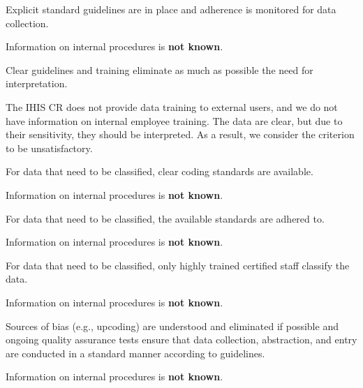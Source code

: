 \begin{QandA}
    \item Explicit standard guidelines are in place and adherence is monitored for data collection.
    \begin{answered}
        Information on internal procedures is \textbf{not known}.
    \end{answered}

    \item Clear guidelines and training eliminate as much as possible the need for interpretation.
    \begin{answered}
        The IHIS CR does not provide data training to external users, and we do not have information on internal employee training.
        The data are clear, but due to their sensitivity, they should be interpreted.
        As a result, we consider the criterion to be unsatisfactory.
    \end{answered}

    \item For data that need to be classified, clear coding standards are available.
    \begin{answered}
        Information on internal procedures is \textbf{not known}.
    \end{answered}

    \item For data that need to be classified, the available standards are adhered to.
    \begin{answered}
        Information on internal procedures is \textbf{not known}.
    \end{answered}

    \item For data that need to be classified, only highly trained certified staff classify the data.
    \begin{answered}
        Information on internal procedures is \textbf{not known}.
    \end{answered}

    \item Sources of bias (e.g., upcoding) are understood and eliminated if possible and ongoing quality assurance tests ensure that data collection, abstraction, and entry are conducted in a standard manner according to guidelines.
    \begin{answered}
        Information on internal procedures is \textbf{not known}.
    \end{answered}

\end{QandA}

